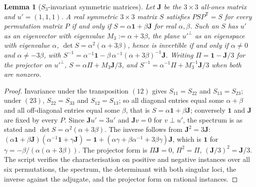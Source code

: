 \documentclass[11pt]{article}
\newtheorem{lemma}[theorem]{Lemma}
\theoremstyle{definition}
\theoremstyle{plain}
\providecommand{\J}{}\renewcommand{\J}{\mathbf{J}}
\begin{document}
\begin{lemma}[$S_{3}$-invariant symmetric matrices]\label{c:neutrino.invariant-symmetric-matrices}
Let $\J$ be the $3 \times 3$ all-ones matrix and $u' = (1,1,1)$. A real symmetric $3 \times 3$ matrix $S$ satisfies $PSP^{\mathsf{T}} = S$ for every permutation matrix $P$ if and only if $S = \alpha\mathbf{1} + \beta\J$ for real $\alpha, \beta$. Such an $S$ has $u'$ as an eigenvector with eigenvalue $M_{3} := \alpha + 3\beta$, the plane $u'^{\perp}$ as an eigenspace with eigenvalue $\alpha$, $\det S = \alpha^{2}(\alpha + 3\beta)$, hence is invertible if and only if $\alpha \neq 0$ and $\alpha \neq -3\beta$, with $S^{-1} = \alpha^{-1}\mathbf{1} - \beta\,\alpha^{-1}(\alpha + 3\beta)^{-1}\J$. Writing $\Pi = \mathbf{1} - \J/3$ for the projector on $u'^{\perp}$, $S = \alpha\Pi + M_{3}\J/3$, and $S^{-1} = \alpha^{-1}\Pi + M_{3}^{-1}\J/3$ when both are nonzero.
\end{lemma}
\begin{proof}
Invariance under the transposition $(12)$ gives $S_{11} = S_{22}$ and $S_{13} = S_{23}$; under $(23)$, $S_{22} = S_{33}$ and $S_{12} = S_{13}$; so all diagonal entries equal some $\alpha + \beta$ and all off-diagonal entries equal some $\beta$, that is $S = \alpha\mathbf{1} + \beta\J$; conversely $\mathbf{1}$ and $\J$ are fixed by every $P$. Since $\J u' = 3u'$ and $\J v = 0$ for $v \perp u'$, the spectrum is as stated and $\det S = \alpha^{2}(\alpha + 3\beta)$. The inverse follows from $\J^{2} = 3\J$: $(\alpha\mathbf{1} + \beta\J)(\alpha^{-1}\mathbf{1} + \gamma\J) = \mathbf{1} + (\alpha\gamma + \beta\alpha^{-1} + 3\beta\gamma)\J$, which is $\mathbf{1}$ for $\gamma = -\beta/(\alpha(\alpha + 3\beta))$. The projector form is $\Pi\J = 0$, $\Pi^{2} = \Pi$, $(\J/3)^{2} = \J/3$. The script verifies the characterisation on positive and negative instances over all six permutations, the spectrum, the determinant with both singular loci, the inverse against the adjugate, and the projector form on rational instances.

\end{proof}
\end{document}
